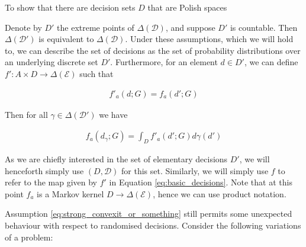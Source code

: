 To show that there are decision sets $D$ that are Polish spaces

Denote by $D'$ the extreme points of $\Delta(\mathcal{D})$, and suppose $D'$ is countable. Then $\Delta(\mathcal{D}')$ is equivalent to $\Delta(\mathcal{D})$. Under these assumptions, which we will hold to, we can describe the set of decisions as the set of probability distributions over an underlying discrete set $D'$. Furthermore, for an element $d\in D'$, we can define $f':A\times D\to \Delta(\mathcal{E})$ such that

\begin{align}
	f'_a(d;G) = f_a(d';G)
\end{align}

Then for all $\gamma\in \Delta(\mathcal{D}')$ we have

\begin{align}
	f_a(d_\gamma;G) = \int_D f'_a(d';G) d\gamma(d') \label{eq:basic_decisions}
\end{align}



As we are chiefly interested in the set of elementary decisions $D'$, we will henceforth simply use $(D,\mathcal{D})$ for this set. Similarly, we will simply use $f$ to refer to the map given by $f'$ in Equation \ref{eq:basic_decisions}. Note that at this point $f_a$ is a Markov kernel $D\to \Delta(\mathcal{E})$, hence we can use product notation.

Assumption \ref{eq:strong_convexit_or_something} still permits some unexpected behaviour with respect to randomised decisions. Consider the following variations of a problem:

